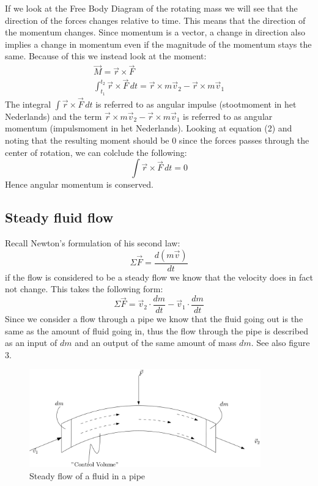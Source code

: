 \documentclass[11pt, a4paper]{article}
\begin{document}
If we look at the Free Body Diagram of the rotating mass we will see that the direction of the forces 
changes relative to time. This means that the direction of the momentum changes. Since momentum is a 
vector, a change in direction also implies a change in momentum even if the magnitude of the momentum 
stays the same. Because of this we instead look at the moment:
\begin{gather}
    \vec{M} = \vec{r} \times \vec{F}\\
    \int_{t_1}^{t_2} \vec{r} \times \vec{F}\,dt = \vec{r}\times m\vec{v}_2 - \vec{r}\times m\vec{v}_1
\end{gather}
The integral $\int \vec{r} \times \vec{F}\,dt$ is referred to as angular impulse (stootmoment in het 
Nederlands) and the term $\vec{r}\times m\vec{v}_2 - \vec{r}\times m\vec{v}_1$ is referred to as angular
momentum (impulsmoment in het Nederlands). Looking at equation (2) and noting that the resulting moment 
should be 0 since the forces passes through the center of rotation, we can colclude the following:
\begin{equation}
    \int \vec{r} \times \vec{F}\,dt = 0
\end{equation}
Hence angular momentum is conserved.

\subsection{Steady fluid flow}
Recall Newton's formulation of his second law:
\begin{equation}
    \Sigma \vec{F} = \frac{d(m\vec{v})}{dt}
\end{equation}
if the flow is considered to be a steady flow we know that the velocity does in fact not change. 
This takes the following form:
\begin{equation}
    \Sigma \vec{F} = \vec{v}_2 \cdot \frac{dm}{dt} -  \vec{v}_1 \cdot \frac{dm}{dt}
\end{equation}
Since we consider a flow through a pipe we know that the fluid going out is the same as the amount
of fluid going in, thus the flow through the pipe is described as an input of $dm$ and an output of
the same amount of mass $dm$. See also figure 3.

\begin{figure}[h]
  \centerline{\includegraphics[width=100mm]{images/Fluid_flow.png}}
  \caption{Steady flow of a fluid in a pipe}
\end{figure}
\end{document}
